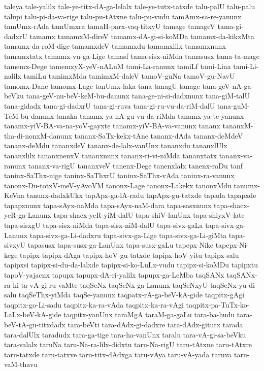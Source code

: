 {taleya
tale-yalilx
tale-ye-titx-dA-ga-lelalx
tale-ye-tutx-tatxde
talu-palU
talu-palu
talupi
talu-pi-da-va-rige
talu-pu-tAtxne
talu-pu-vudu
tamAmx-sa-re-yanunx
tamUmx-rAda
tamUmxra
tamaH-parx-vaq-titxyU
tamage
tamageV
tama-gi-dadxrU
tamamx
tamamxM-direV
tamamx-dA-gi-si-koMDa
tamamx-da-kikxMta
tamamx-da-roM-dige
tamamxdeV
tamamxdu
tamamxlilx
tamamxnunx
tamamxtatx
tamamx-vu-ga-Lige
tamasf
tama-sisx-niMda
tamasusx
tama-ta-mage
tamemx-Dege
tamemxyX-yeV-nALuM
tami-La-ranunx
tamiLf
tami-Lina
tami-Li-nalilx
tamiLu
tamimxMda
tamimxM-daleV
tamoV-guNa
tamoV-gu-NavU
tamomx-Dane
tamomx-Lage
tanUmx-laka
tana
tanagU
tanage
tana-geV-nA-ga-beVku
tana-geV-nu-beV-keM-bu-danunx
tana-ge-ni-si-dadxnunx
tana-giM-talU
tana-gidadx
tana-gi-dadxrU
tana-gi-ruva
tana-gi-ru-vu-da-riM-dalU
tana-guM-TeM-bu-danunx
tanaka
tanamx-ya-nA-gu-vu-da-riMda
tanamx-ya-te-yanunx
tanamx-yiV-BA-va-na-yoV-gayxte
tanamx-yiV-BA-va-vanunx
tananx
tananxM-tha-di-nonxM-danunx
tananx-SaTx-kekx-tAne
tananx-dAda
tananx-deMdeV
tananx-deMdu
tananxdeV
tananx-de-lalx-vanUnx
tananxdu
tananxlUlx
tananxlilx
tananxnenxV
tananxnunx
tananx-ri-vi-niMda
tananxtatx
tananx-va-ranunx
tananx-va-rigU
tananxveV
tanenx-Dege
tanenxlalx
tanenx-raDu
tanf
taninx-SaThx-nige
taninx-SaThxrU
taninx-SaThx-vAda
taninx-ra-vanunx
tanonx-Du-totxV-meV-yAvoVM
tanonx-Lage
tanonx-Lakekx
tanonxMdu
tanumx-KeVna
tanunx-dadxkUkx
tapApx-ga-lA-radu
tapApx-gu-tatxde
tapada
tapapxde
tapapxnunx
tapa-sAyx-naMda
tapa-sAyx-naM-dara
tapa-sasxnunx
tapa-shacx-yeR-ga-Lanunx
tapa-shacx-yeR-yiM-dalU
tapa-shiV-lanUnx
tapa-shiyxV-late
tapa-sisxgU
tapa-sisx-niMda
tapa-sisx-niM-dalU
tapa-sivx-gaLa
tapa-sivx-ga-Lanunx
tapa-sivx-ga-Li-dadxru
tapa-sivx-ga-Lige
tapa-sivx-ga-Li-giMta
tapa-sivxyU
tapasusx
tapa-susx-ga-LanUnx
tapa-susx-gaLu
tapepx-Nike
tapepx-Ni-kege
tapipx
tapipx-dAga
tapipx-hoV-gu-tatxde
tapipx-hoV-yitu
tapipx-salu
tapipxsi
tapipx-si-du-da-lalxde
tapipx-si-ko-LuLx-vudu
tapipx-si-koMDu
tapipxtu
tapoV-yajacnx
tapupx
tapupx-dA-ri-yalilx
tapupx-ga-LeMba
taqSANx
taqSANx-ra-hi-ta-vA-gi-ru-vaMte
taqSeNx
taqSeNx-ga-Lanunx
taqSeNxyU
taqSeNx-yu-di-salu
taqSeThx-yiMda
taqSe-yanunx
taqpatx-rA-ga-beV-kA-gide
taqpitx-gAgi
taqpitx-go-Li-sadu
taqpitx-ka-ra-vAda
taqpitx-ka-ra-vAgi
taqpitx-pa-TuTx-ko-LaLx-beV-kA-gide
taqpitx-yanUnx
taraMgA
taraM-ga-gaLu
tara-ba-hudu
tara-beV-tA-gu-titxdadx
tara-beVti
tara-dAdx-gi-dadxre
tara-dAdx-gitutx
tarada
tara-dalUlx
taradudx
tara-ga-tige
tara-ha-vanUnx
taralu
tara-vA-gi-sa-beVku
tara-valalx
taruNa
taru-Na-ra-lilx-didxtu
taru-Na-rigU
taru-tAtxne
taru-tAtxre
taru-tatxde
taru-tatxve
taru-titx-dAdxga
taru-vAya
taru-vA-yada
taruva
taru-vaM-thavu
}
